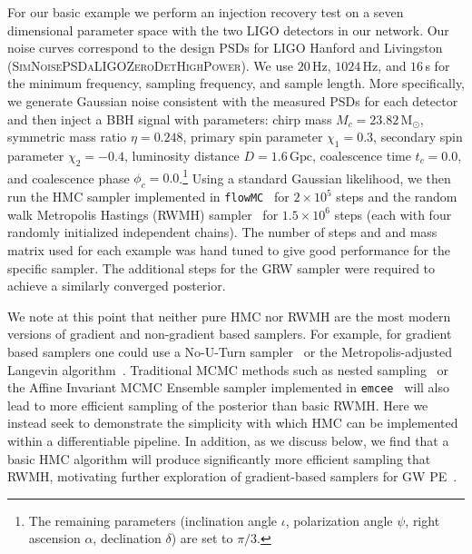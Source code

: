\documentclass[twocolumn]{aastex631}
\newcommand{\flowMC}{\texttt{flowMC}\xspace}
\newcommand{\AZ}[1]{{\color{Burnt}[AZ: #1]}}
\newcommand{\amc}[1]{{\color{red}[AC: #1]}}
\begin{document}
For our basic example we perform an injection recovery test on a seven dimensional parameter space with the two LIGO detectors in our network.
Our noise curves correspond to the design PSDs for LIGO Hanford and Livingston (\textsc{SimNoisePSDaLIGOZeroDetHighPower}).
We use $20\,$Hz, $1024\,$Hz, and $16\,$s for the minimum frequency, sampling frequency, and sample length.
More specifically, we generate Gaussian noise consistent with the measured PSDs for each detector and then inject a BBH signal with parameters: chirp mass $M_c = 23.82\,\mathrm{M_\odot}$,  symmetric mass ratio $\eta = 0.248$, primary spin parameter $\chi_1=0.3$, secondary spin parameter $\chi_2=-0.4$, luminosity distance $D = 1.6\,\mathrm{Gpc}$, coalescence time $t_c = 0.0$, and coalescence phase $\phi_c = 0.0$.\footnote{
    The remaining parameters (inclination angle $\iota$, polarization angle $\psi$, right ascension $\alpha$, declination $\delta$) are set to $\pi/3$.
}
Using a standard Gaussian likelihood, we then run the HMC sampler implemented in \flowMC~\citep{2022arXiv221106397W} for $2\times10^5$ steps and the random walk Metropolis Hastings (RWMH) sampler~\citep{1953JChPh..21.1087M} for $1.5\times10^6$ steps (each with four randomly initialized independent chains). 
The number of steps and and mass matrix used for each example was hand tuned to give good performance for the specific sampler.
The additional steps for the GRW sampler were required to achieve a similarly converged posterior.

We note at this point that neither pure HMC nor RWMH are the most modern versions of gradient and non-gradient based samplers.
For example, for gradient based samplers one could use a No-U-Turn sampler~\citep{2011arXiv1111.4246H} or the Metropolis-adjusted Langevin algorithm~\citep{2013arXiv1309.2983X}.
Traditional MCMC methods such as nested sampling~\citep{Skilling2004, multinest, dynesty} or the Affine Invariant MCMC Ensemble sampler implemented in \texttt{emcee}~\citep{2013PASP..125..306F} will also lead to more efficient sampling of the posterior than basic RWMH.
Here we instead seek to demonstrate the simplicity with which HMC can be implemented within a differentiable pipeline.
In addition, as we discuss below, we find that a basic HMC algorithm will produce significantly more efficient sampling that RWMH, motivating further exploration of gradient-based samplers for GW PE~\citep{PEpaper}.
\end{document}

